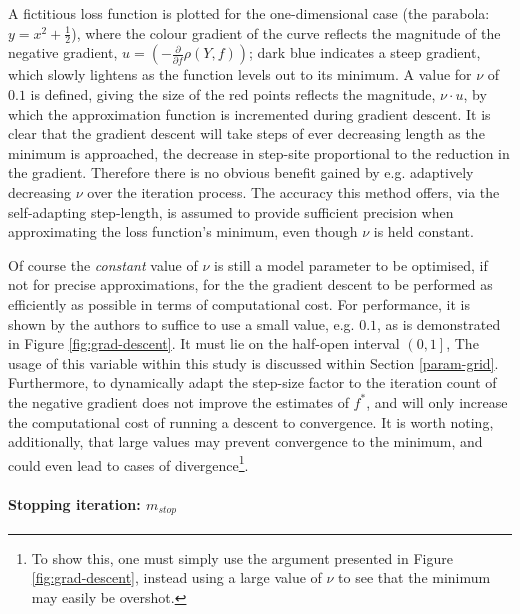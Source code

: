 \documentclass{article}
\begin{document}
A fictitious loss function is plotted for the one-dimensional case (the parabola: $y = x^2 + \frac{1}{2}$), where the colour gradient of the curve reflects the magnitude of the negative gradient, $u = \left( - \frac{\partial}{\partial f}\rho (Y, f)\right)$; dark blue indicates a steep gradient, which slowly lightens as the function levels out to its minimum. A value for $\nu$ of $0.1$ is defined, giving the size of the red points reflects the magnitude, $\nu \cdot u$, by which the approximation function is incremented during gradient descent. It is clear that the gradient descent will take steps of ever decreasing length as the minimum is approached, the decrease in step-site proportional to the reduction in the gradient. Therefore there is no obvious benefit gained by e.g. adaptively decreasing $\nu$ over the iteration process. The accuracy this method offers, via the self-adapting step-length, is assumed to provide sufficient precision when approximating the loss function's minimum, even though $\nu$ is held constant.

Of course the \emph{constant} value of $\nu$ is still a model parameter to be optimised, if not for precise approximations, for the the gradient descent to be performed as efficiently as possible in terms of computational cost. For performance, it is shown by the authors \cite{schmid2008boosting} to suffice to use a small value, e.g. $0.1$, as is demonstrated in Figure \ref{fig:grad-descent}. It must lie on the half-open interval $\left(0 , 1 \right]$, The usage of this variable within this study is discussed within Section \ref{param-grid}. Furthermore, to dynamically adapt the step-size factor to the iteration count of the negative gradient does not improve the estimates of $f^*$, and will only increase the computational cost of running a descent to convergence. It is worth noting, additionally, that large values may prevent convergence to the minimum, and could even lead to cases of divergence\footnote{To show this, one must simply use the argument presented in Figure \ref{fig:grad-descent}, instead using a large value of $\nu$ to see that the minimum may easily be overshot.}.


\paragraph{Stopping iteration: $m_{stop}$ \label{mstop}}
\label{sec-5-4-2-2}
\end{document}
